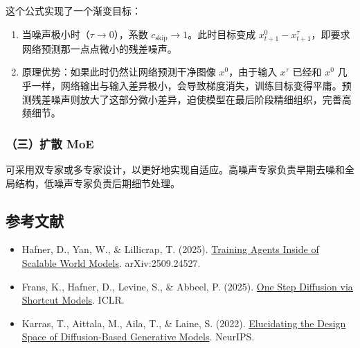 这个公式实现了一个渐变目标：

\begin{enumerate}
\def\labelenumi{\arabic{enumi}.}
\tightlist
\item
  当噪声极小时（\(\tau\to 0\)），系数 \(c_{\mathrm{skip}}\to 1\)。此时目标变成 \(x_{t+1}^0-x_{t+1}^{\tau}\)，即要求网络预测那一点点微小的残差噪声。
\item
  原理优势：如果此时仍然让网络预测干净图像 \(x^0\)，由于输入 \(x^\tau\) 已经和 \(x^0\) 几乎一样，网络输出与输入差异极小，会导致梯度消失，训练目标变得平庸。预测残差噪声则放大了这部分微小差异，迫使模型在最后阶段精细组织，完善高频细节。
\end{enumerate}

\hypertarget{ux4e09ux6269ux6563-moe}{%
\subsubsection{（三）扩散 MoE}\label{ux4e09ux6269ux6563-moe}}

可采用双专家或多专家设计，以更好地实现自适应。高噪声专家负责早期去噪和全局结构，低噪声专家负责后期细节处理。

\FloatBarrier
{}
\hypertarget{ux53c2ux8003ux6587ux732e-143}{%
\subsection{参考文献}\label{ux53c2ux8003ux6587ux732e-143}}

\vspace{0.25em}
\begin{itemize}
\tightlist
\item
  Hafner, D., Yan, W., \& Lillicrap, T. (2025). \href{https://arxiv.org/abs/2509.24527}{Training Agents Inside of Scalable World Models}. arXiv:2509.24527.
\item
  Frans, K., Hafner, D., Levine, S., \& Abbeel, P. (2025). \href{https://arxiv.org/abs/2410.12557}{One Step Diffusion via Shortcut Models}. ICLR.
\item
  Karras, T., Aittala, M., Aila, T., \& Laine, S. (2022). \href{https://arxiv.org/abs/2206.00364}{Elucidating the Design Space of Diffusion-Based Generative Models}. NeurIPS.
\end{itemize}

\clearpage
